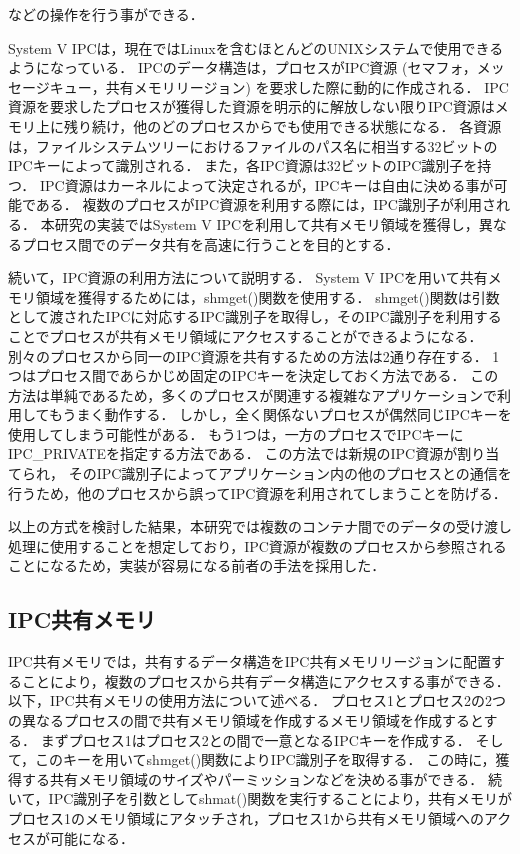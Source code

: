などの操作を行う事ができる．

System V IPCは，現在ではLinuxを含むほとんどのUNIXシステムで使用できるようになっている．
IPCのデータ構造は，プロセスがIPC資源 (セマフォ，メッセージキュー，共有メモリリージョン) を要求した際に動的に作成される．
IPC資源を要求したプロセスが獲得した資源を明示的に解放しない限りIPC資源はメモリ上に残り続け，他のどのプロセスからでも使用できる状態になる．
各資源は，ファイルシステムツリーにおけるファイルのパス名に相当する32ビットのIPCキーによって識別される．
また，各IPC資源は32ビットのIPC識別子を持つ．
IPC資源はカーネルによって決定されるが，IPCキーは自由に決める事が可能である．
複数のプロセスがIPC資源を利用する際には，IPC識別子が利用される．
本研究の実装ではSystem V IPCを利用して共有メモリ領域を獲得し，異なるプロセス間でのデータ共有を高速に行うことを目的とする．

続いて，IPC資源の利用方法について説明する．
System V IPCを用いて共有メモリ領域を獲得するためには，shmget()関数を使用する．
shmget()関数は引数として渡されたIPCに対応するIPC識別子を取得し，そのIPC識別子を利用することでプロセスが共有メモリ領域にアクセスすることができるようになる．
別々のプロセスから同一のIPC資源を共有するための方法は2通り存在する．
1つはプロセス間であらかじめ固定のIPCキーを決定しておく方法である．
この方法は単純であるため，多くのプロセスが関連する複雑なアプリケーションで利用してもうまく動作する．
しかし，全く関係ないプロセスが偶然同じIPCキーを使用してしまう可能性がある．
もう1つは，一方のプロセスでIPCキーにIPC\_PRIVATEを指定する方法である．
この方法では新規のIPC資源が割り当てられ， そのIPC識別子によってアプリケーション内の他のプロセスとの通信を行うため，他のプロセスから誤ってIPC資源を利用されてしまうことを防げる．

以上の方式を検討した結果，本研究では複数のコンテナ間でのデータの受け渡し処理に使用することを想定しており，IPC資源が複数のプロセスから参照されることになるため，実装が容易になる前者の手法を採用した．

\subsection*{IPC共有メモリ}

IPC共有メモリでは，共有するデータ構造をIPC共有メモリリージョンに配置することにより，複数のプロセスから共有データ構造にアクセスする事ができる．
以下，IPC共有メモリの使用方法について述べる．
プロセス1とプロセス2の2つの異なるプロセスの間で共有メモリ領域を作成するメモリ領域を作成するとする．
まずプロセス1はプロセス2との間で一意となるIPCキーを作成する．
そして，このキーを用いてshmget()関数によりIPC識別子を取得する．
この時に，獲得する共有メモリ領域のサイズやパーミッションなどを決める事ができる．
続いて，IPC識別子を引数としてshmat()関数を実行することにより，共有メモリがプロセス1のメモリ領域にアタッチされ，プロセス1から共有メモリ領域へのアクセスが可能になる．


